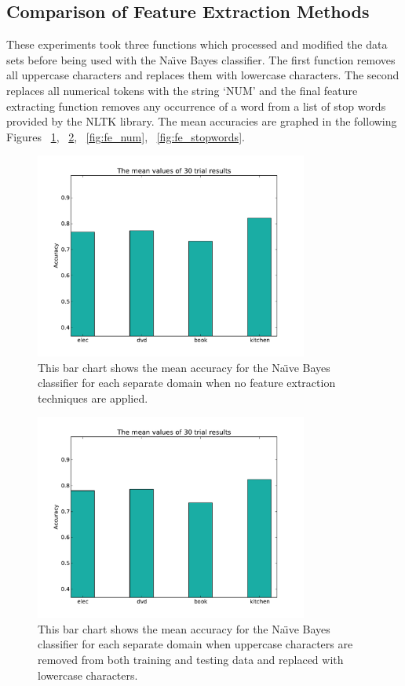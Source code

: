 \documentclass{llncs}
\begin{document}
\subsection{Comparison of Feature Extraction Methods} %
These experiments took three functions which processed and modified the data sets before being used with the Na\"\i ve Bayes classifier. The first function removes all uppercase characters and replaces them with lowercase characters. The second replaces all numerical tokens with the string `NUM' and the final feature extracting function removes any occurrence of a word from a list of stop words provided by the NLTK library. The mean accuracies are graphed in the following Figures ~\ref{fig:fe_nofe}, ~\ref{fig:fe_lowercase}, ~\ref{fig:fe_num}, ~\ref{fig:fe_stopwords}.

\begin{figure}
    \centering
    \includegraphics[width=0.8\textwidth]{nb_no_feature_extractor.pdf}
    \caption{This bar chart shows the mean accuracy for the Na\"\i ve Bayes classifier for each separate domain when no feature extraction techniques are applied.}
    \label{fig:fe_nofe}
\end{figure}

\begin{figure}
    \centering
    \includegraphics[width=0.8\textwidth]{nb_feature_extractor_lowercase.pdf}
    \caption{This bar chart shows the mean accuracy for the Na\"\i ve Bayes classifier for each separate domain when uppercase characters are removed from both training and testing data and replaced with lowercase characters.}
    \label{fig:fe_lowercase}
\end{figure}
\end{document}
